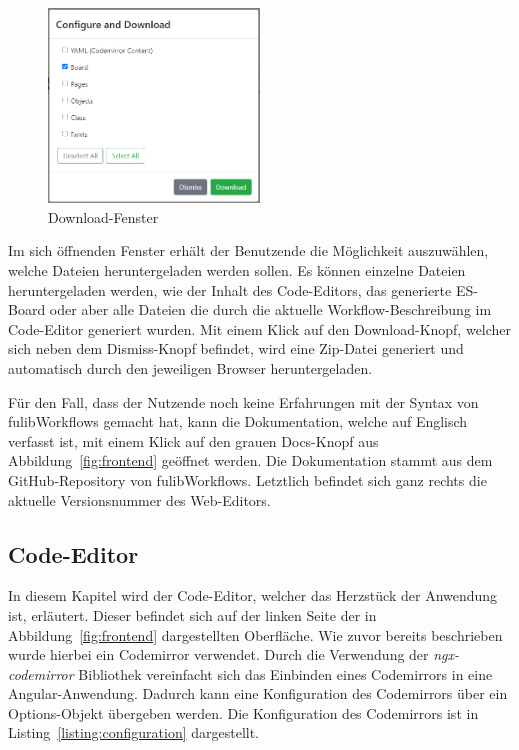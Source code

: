 \begin{figure}[h]
    \centering
    \includegraphics[width=0.5\textwidth]{images/3.2/download}
    \caption{Download-Fenster}
    \label{fig:download}
\end{figure}

Im sich öffnenden Fenster erhält der Benutzende die Möglichkeit auszuwählen, welche Dateien heruntergeladen werden sollen.
Es können einzelne Dateien heruntergeladen werden, wie der Inhalt des Code-Editors, das generierte \ac{ES}-Board oder aber alle Dateien
die durch die aktuelle Workflow-Beschreibung im Code-Editor generiert wurden.
Mit einem Klick auf den Download-Knopf, welcher sich neben dem Dismiss-Knopf befindet, wird eine Zip-Datei generiert und automatisch durch den jeweiligen Browser heruntergeladen.

Für den Fall, dass der Nutzende noch keine Erfahrungen mit der Syntax von fulibWorkflows gemacht hat, kann die Dokumentation, welche auf Englisch verfasst ist, mit einem Klick
auf den grauen Docs-Knopf aus Abbildung~\ref{fig:frontend} geöffnet werden.
Die Dokumentation stammt aus dem GitHub-Repository von fulibWorkflows.
Letztlich befindet sich ganz rechts die aktuelle Versionsnummer des Web-Editors.

\subsection{Code-Editor}\label{subsec:codeeditor}
In diesem Kapitel wird der Code-Editor, welcher das Herzstück der Anwendung ist, erläutert.
Dieser befindet sich auf der linken Seite der in Abbildung~\ref{fig:frontend} dargestellten Oberfläche.
Wie zuvor bereits beschrieben wurde hierbei ein Codemirror verwendet.
Durch die Verwendung der \textit{ngx-codemirror} Bibliothek vereinfacht sich das Einbinden eines Codemirrors in eine Angular-Anwendung.
Dadurch kann eine Konfiguration des Codemirrors über ein Options-Objekt übergeben werden.
Die Konfiguration des Codemirrors ist in Listing~\ref{listing:configuration} dargestellt.

